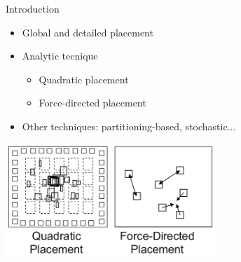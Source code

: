 \documentclass{beamer}
\begin{document}
\begin{frame}{Introduction}
\begin{itemize}
\item Global and detailed placement
\item Analytic tecnique
\begin{itemize}
\item Quadratic placement
\item Force-directed placement
\end{itemize}
\item Other techniques: partitioning-based, stochastic...
\end{itemize}

\centering
\includegraphics[width=0.6\textwidth]{images/placement.png}

\end{frame}
\end{document}

